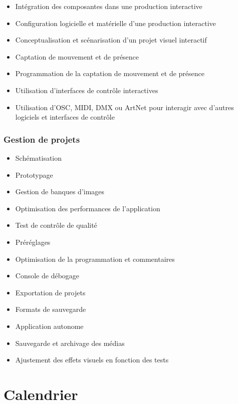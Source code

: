 \documentclass[
  french,
]{book}
\providecommand{\tightlist}{%
  \setlength{\itemsep}{0pt}\setlength{\parskip}{0pt}}
\begin{document}
\begin{itemize}
\tightlist
\item
  Intégration des composantes dans une production interactive
\item
  Configuration logicielle et matérielle d'une production interactive\\
\item
  Conceptualisation et scénarisation d'un projet visuel interactif\\
\item
  Captation de mouvement et de présence
\item
  Programmation de la captation de mouvement et de présence
\item
  Utilisation d'interfaces de contrôle interactives
\item
  Utilisation d'OSC, MIDI, DMX ou ArtNet pour interagir avec d'autres logiciels et interfaces de contrôle
\end{itemize}

\hypertarget{gestion-de-projets}{%
\subsection{Gestion de projets}\label{gestion-de-projets}}

\begin{itemize}
\tightlist
\item
  Schématisation
\item
  Prototypage
\item
  Gestion de banques d'images
\item
  Optimisation des performances de l'application
\item
  Test de contrôle de qualité
\item
  Préréglages
\item
  Optimisation de la programmation et commentaires
\item
  Console de débogage
\item
  Exportation de projets
\item
  Formats de sauvegarde\\
\item
  Application autonome
\item
  Sauvegarde et archivage des médias
\item
  Ajustement des effets visuels en fonction des tests
\end{itemize}

\hypertarget{calendrier}{%
\chapter{Calendrier}\label{calendrier}}
\end{document}
